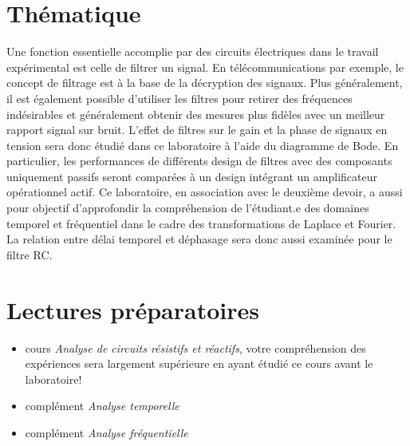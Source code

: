 \documentclass[canadien,12pt,oneside,letterpaper]{article}
\begin{document}
\section{Thématique}\label{sec:theme}
\vspace{-1.5ex}
Une fonction essentielle accomplie par des circuits électriques dans le travail expérimental est celle de filtrer un signal. En télécommunications par exemple, le concept de filtrage est à la base de la décryption des signaux. Plus généralement, il est également possible d'utiliser les filtres pour retirer des fréquences indésirables et généralement obtenir des mesures plus fidèles avec un meilleur rapport signal sur bruit. L’effet de filtres sur le gain et la phase de signaux en tension sera donc étudié dans ce laboratoire à l’aide du diagramme de Bode. En particulier, les performances de différents design de filtres avec des composants uniquement passifs seront comparées à un design intégrant un amplificateur opérationnel actif. Ce laboratoire, en association avec le deuxième devoir, a aussi pour objectif d’approfondir la compréhension de l’étudiant.e des domaines temporel et fréquentiel dans le cadre des transformations de Laplace et Fourier. La relation entre délai temporel et déphasage sera donc aussi examinée pour le filtre RC.\\

\vspace{-2ex}
\section{Lectures préparatoires}\label{sec:lectures}

\begin{itemize}
\item cours \textit{Analyse de circuits résistifs et réactifs}, votre compréhension des expériences sera largement supérieure en ayant étudié ce cours avant le laboratoire!
\item complément \textit{Analyse temporelle}
\item complément \textit{Analyse fréquentielle}
\end{itemize}


\vspace{-2ex}
\end{document}
